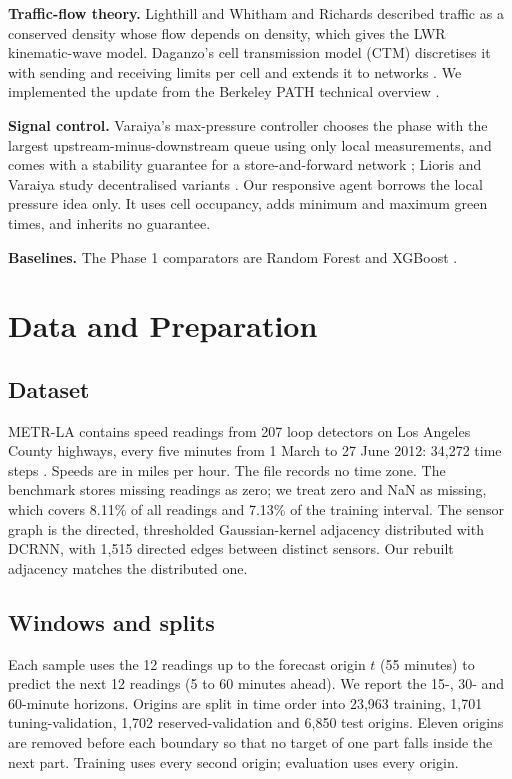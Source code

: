 \documentclass[conference]{IEEEtran}
\begin{document}
\textbf{Traffic-flow theory.} Lighthill and Whitham \cite{lw} and Richards \cite{richards} described traffic as a conserved density whose flow depends on density, which gives the LWR kinematic-wave model. Daganzo's cell transmission model (CTM) discretises it with sending and receiving limits per cell \cite{ctm1} and extends it to networks \cite{ctm2}. We implemented the update from the Berkeley PATH technical overview \cite{ctmoverview}.

\textbf{Signal control.} Varaiya's max-pressure controller chooses the phase with the largest upstream-minus-downstream queue using only local measurements, and comes with a stability guarantee for a store-and-forward network \cite{maxpressure}; Lioris and Varaiya study decentralised variants \cite{lioris}. Our responsive agent borrows the local pressure idea only. It uses cell occupancy, adds minimum and maximum green times, and inherits no guarantee.

\textbf{Baselines.} The Phase 1 comparators are Random Forest \cite{rf} and XGBoost \cite{xgb}.

\section{Data and Preparation}
\subsection{Dataset}
METR-LA contains speed readings from 207 loop detectors on Los Angeles County highways, every five minutes from 1 March to 27 June 2012: 34,272 time steps \cite{dcrnn}. Speeds are in miles per hour. The file records no time zone. The benchmark stores missing readings as zero; we treat zero and NaN as missing, which covers 8.11\% of all readings and 7.13\% of the training interval. The sensor graph is the directed, thresholded Gaussian-kernel adjacency distributed with DCRNN, with 1,515 directed edges between distinct sensors. Our rebuilt adjacency matches the distributed one.

\subsection{Windows and splits}
Each sample uses the 12 readings up to the forecast origin $t$ (55 minutes) to predict the next 12 readings (5 to 60 minutes ahead). We report the 15-, 30- and 60-minute horizons. Origins are split in time order into 23,963 training, 1,701 tuning-validation, 1,702 reserved-validation and 6,850 test origins. Eleven origins are removed before each boundary so that no target of one part falls inside the next part. Training uses every second origin; evaluation uses every origin.
\end{document}
